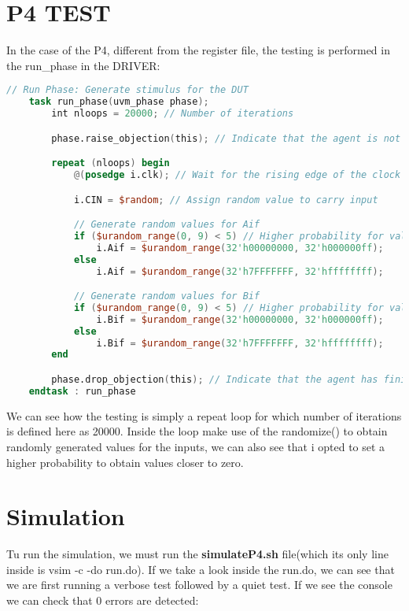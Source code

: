 \documentclass[12pt,a4paper]{report}
\begin{document}
\section{P4 TEST}
In the case of the P4, different from the register file, the testing is performed in the run\_phase in the DRIVER:
\vspace{0.3cm}
\begin{lstlisting}[language=Verilog, caption= run\_phase inside driver.svh, label=lst:sysverilog]
// Run Phase: Generate stimulus for the DUT
    task run_phase(uvm_phase phase);
        int nloops = 20000; // Number of iterations

        phase.raise_objection(this); // Indicate that the agent is not finished yet

        repeat (nloops) begin
            @(posedge i.clk); // Wait for the rising edge of the clock

            i.CIN = $random; // Assign random value to carry input

            // Generate random values for Aif
            if ($urandom_range(0, 9) < 5) // Higher probability for values closer to 0
                i.Aif = $urandom_range(32'h00000000, 32'h000000ff);
            else
                i.Aif = $urandom_range(32'h7FFFFFFF, 32'hffffffff);

            // Generate random values for Bif
            if ($urandom_range(0, 9) < 5) // Higher probability for values closer to 0
                i.Bif = $urandom_range(32'h00000000, 32'h000000ff);
            else
                i.Bif = $urandom_range(32'h7FFFFFFF, 32'hffffffff);
        end

        phase.drop_objection(this); // Indicate that the agent has finished
    endtask : run_phase
\end{lstlisting}
\vspace{0.3cm}
We can see how the testing is simply a repeat loop for which number of iterations
is defined here as 20000. Inside the loop make use of the randomize() to obtain randomly generated values for the inputs, we can also see that i opted to set a higher probability to obtain values closer to zero.
\section{Simulation}
Tu run the simulation, we must run the \textbf{simulateP4.sh} file(which its only line inside is vsim -c -do run.do).
If we take a look inside the run.do, we can see that we are first running a verbose test followed by a quiet test. If we see the console we can check that 0 errors are detected:
\end{document}
